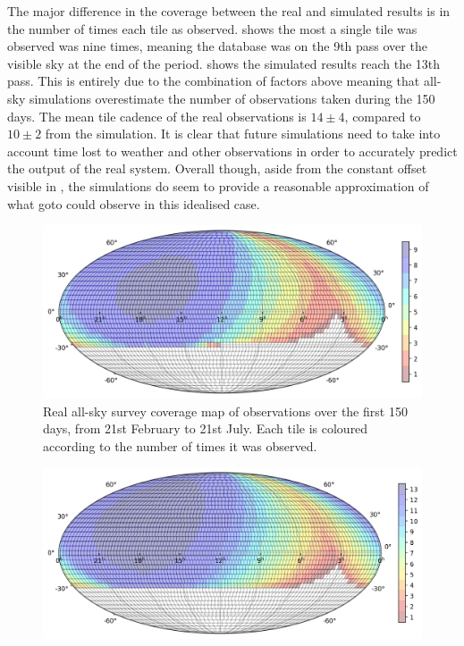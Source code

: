 \begin{colsection}
\begin{colsection}
The major difference in the coverage between the real and simulated results is in the number of times each tile as observed.  shows the most a single tile was observed was nine times, meaning the database was on the 9th pass over the visible sky at the end of the period.  shows the simulated results reach the 13th pass. This is entirely due to the combination of factors above meaning that all-sky simulations overestimate the number of observations taken during the 150 days. The mean tile cadence of the real observations is $14\pm4$, compared to $10\pm2$ from the simulation. It is clear that future simulations need to take into account time lost to weather and other observations in order to accurately predict the output of the real system. Overall though, aside from the constant offset visible in , the simulations do seem to provide a reasonable approximation of what \gls{goto} could observe in this idealised case.

\begin{figure}[p]
    \begin{center}
        \includegraphics[width=\linewidth]{images/allsky_sims/real.png}
    \end{center}

    \caption[Real all-sky survey coverage map of observations over the first 150 days]{
        Real all-sky survey coverage map of observations over the first 150 days, from 21st February to 21st July. Each tile is coloured according to the number of times it was observed.
    }\label{fig:allsky_coverage_real}
\end{figure}

\begin{figure}[p]
    \begin{center}
        \includegraphics[width=\linewidth]{images/allsky_sims/150_1N4_lite.png}
    \end{center}


\end{figure}
\end{colsection}
\end{colsection}
